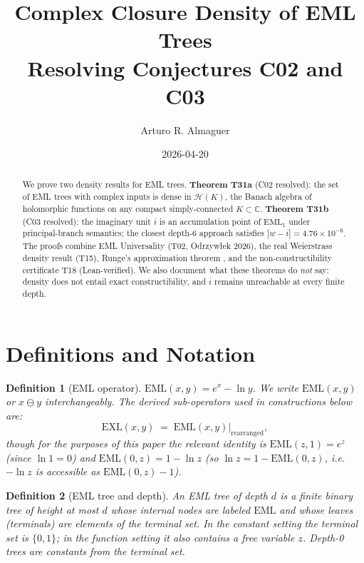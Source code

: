 \documentclass[11pt]{article}
\title{Complex Closure Density of EML Trees\\
       \large Resolving Conjectures C02 and C03}
\author{Arturo R. Almaguer}
\date{2026-04-20}
\newtheorem{definition}{Definition}
\begin{document}
\maketitle

\begin{abstract}
We prove two density results for EML trees.
\textbf{Theorem T31a} (C02 resolved): the set of EML trees with complex inputs is
dense in $\mathcal{H}(K)$, the Banach algebra of holomorphic functions on any compact
simply-connected $K \subset \mathbb{C}$.
\textbf{Theorem T31b} (C03 resolved): the imaginary unit $i$ is an accumulation point
of $\mathrm{EML}_1$ under principal-branch semantics; the closest depth-6 approach
satisfies $|w - i| = 4.76\times10^{-6}$.
The proofs combine EML Universality (T02, Odrzyw\l{}ek 2026), the real Weierstrass
density result (T15), Runge's approximation theorem \cite{Runge1885}, and the
non-constructibility certificate T18 (Lean-verified).
We also document what these theorems do \emph{not} say: density does not entail
exact constructibility, and $i$ remains unreachable at every finite depth.
\end{abstract}

\tableofcontents
\bigskip

\section{Definitions and Notation}

\begin{definition}[EML operator]
$\mathrm{EML}(x,y) = e^{x} - \ln y$.  We write $\mathrm{EML}(x,y)$ or
$x \ominus y$ interchangeably.  The derived sub-operators used in constructions
below are:
\[
  \mathrm{EXL}(x,y) \;=\; \mathrm{EML}(x,y)\big|_{\text{rearranged}} ,
\]
though for the purposes of this paper the relevant identity is
$\mathrm{EML}(z,1) = e^z$ (since $\ln 1 = 0$) and
$\mathrm{EML}(0,z) = 1 - \ln z$ (so $\ln z = 1 - \mathrm{EML}(0,z)$, i.e.\ $-\ln z$
is accessible as $\mathrm{EML}(0,z) - 1$).
\end{definition}

\begin{definition}[EML tree and depth]
An \emph{EML tree of depth $d$} is a finite binary tree of height at most $d$
whose internal nodes are labeled $\mathrm{EML}$ and whose leaves (terminals) are
elements of the terminal set.  In the \emph{constant setting} the terminal set
is $\{0,1\}$; in the \emph{function setting} it also contains a free variable $z$.
Depth-0 trees are constants from the terminal set.
\end{definition}
\end{document}
